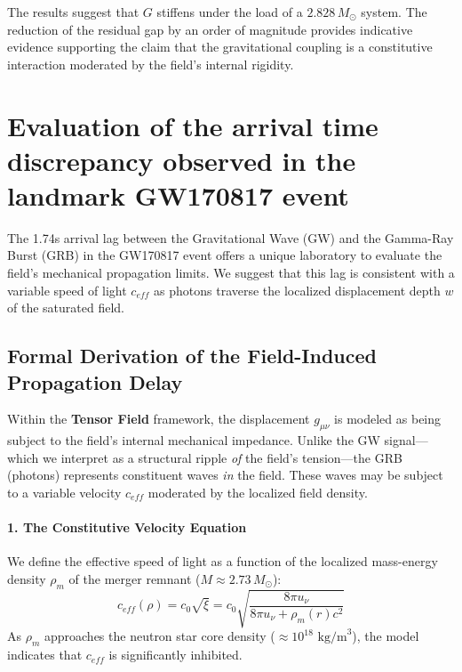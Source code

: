 \documentclass{article}
\begin{document}
The results suggest that $G$ stiffens under the load of a $2.828 \, M_{\odot}$ system. The reduction of the residual gap by an order of magnitude provides indicative evidence supporting the claim that the gravitational coupling is a constitutive interaction moderated by the field's internal rigidity.

\section{Evaluation of the arrival time discrepancy observed in the landmark GW170817 event}

The 1.74s arrival lag between the Gravitational Wave (GW) and the Gamma-Ray Burst (GRB) in the GW170817 event \cite{Abbott2017} offers a unique laboratory to evaluate the field's mechanical propagation limits. We suggest that this lag is consistent with a variable speed of light $c_{eff}$ as photons traverse the localized displacement depth $w$ of the saturated field.

\subsection{Formal Derivation of the Field-Induced Propagation Delay}

Within the \textbf{Tensor Field} framework, the displacement $g_{\mu\nu}$ is modeled as being subject to the field's internal mechanical impedance. Unlike the GW signal—which we interpret as a structural ripple \textit{of} the field's tension—the GRB (photons) represents constituent waves \textit{in} the field. These waves may be subject to a variable velocity $c_{eff}$ moderated by the localized field density.

\paragraph{1. The Constitutive Velocity Equation}
We define the effective speed of light as a function of the localized mass-energy density $\rho_m$ of the merger remnant ($M \approx 2.73 \, M_{\odot}$):
\begin{equation}
c_{eff}(\rho) = c_0 \sqrt{\xi} = c_0 \sqrt{\frac{8\pi u_\nu}{8\pi u_\nu + \rho_m(r) c^2}}
\end{equation}
As $\rho_m$ approaches the neutron star core density ($\approx 10^{18} \text{ kg/m}^3$), the model indicates that $c_{eff}$ is significantly inhibited.
\end{document}
